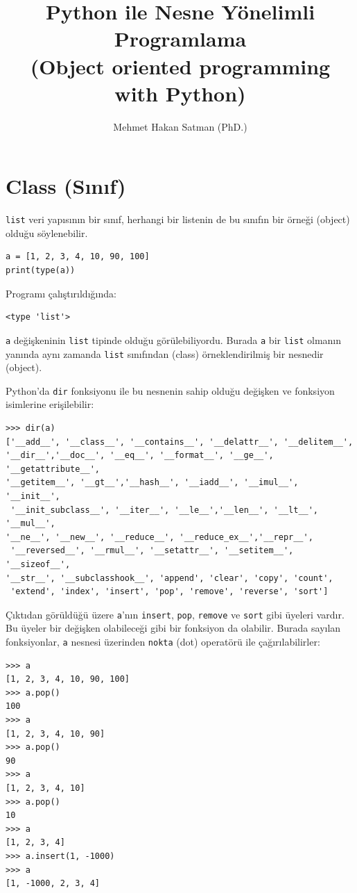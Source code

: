 \documentclass[12pt]{report}
\author{Mehmet Hakan Satman (PhD.)}
\title{Python ile Nesne Yönelimli Programlama \\ (Object oriented programming with Python)}
\begin{document}
	\maketitle
	\tableofcontents
	
\pagebreak
\section{Class (Sınıf)}
\texttt{list} veri yapısının bir sınıf, herhangi bir listenin de bu sınıfın bir örneği (object) olduğu söylenebilir. 

\begin{Verbatim}[frame = single]
a = [1, 2, 3, 4, 10, 90, 100]
print(type(a))
\end{Verbatim}

Programı çalıştırıldığında: 

\begin{Verbatim}[frame = single]
<type 'list'>
\end{Verbatim}

\texttt{a} değişkeninin \texttt{list} tipinde olduğu görülebiliyordu. Burada \texttt{a} bir \texttt{list} olmanın yanında aynı zamanda \texttt{list} sınıfından (class) örneklendirilmiş bir nesnedir (object).

Python'da \texttt{dir} fonksiyonu ile bu nesnenin sahip olduğu değişken ve fonksiyon isimlerine erişilebilir:

\begin{Verbatim}[frame = single]
>>> dir(a)
['__add__', '__class__', '__contains__', '__delattr__', '__delitem__', 
'__dir__','__doc__', '__eq__', '__format__', '__ge__', '__getattribute__', 
'__getitem__', '__gt__','__hash__', '__iadd__', '__imul__', '__init__',
 '__init_subclass__', '__iter__', '__le__','__len__', '__lt__', '__mul__', 
'__ne__', '__new__', '__reduce__', '__reduce_ex__','__repr__',
 '__reversed__', '__rmul__', '__setattr__', '__setitem__', '__sizeof__',
'__str__', '__subclasshook__', 'append', 'clear', 'copy', 'count',
 'extend', 'index', 'insert', 'pop', 'remove', 'reverse', 'sort']
\end{Verbatim}

Çıktıdan görüldüğü üzere \texttt{a}'nın \texttt{insert}, \texttt{pop}, \texttt{remove} ve \texttt{sort} gibi üyeleri vardır. Bu üyeler bir değişken olabileceği gibi bir fonksiyon da olabilir. Burada sayılan fonksiyonlar, \texttt{a} nesnesi üzerinden \texttt{nokta} (dot) operatörü ile çağırılabilirler:

\begin{Verbatim}[frame = single]
>>> a
[1, 2, 3, 4, 10, 90, 100]
>>> a.pop()
100
>>> a
[1, 2, 3, 4, 10, 90]
>>> a.pop()
90
>>> a
[1, 2, 3, 4, 10]
>>> a.pop()
10
>>> a
[1, 2, 3, 4]
>>> a.insert(1, -1000)
>>> a
[1, -1000, 2, 3, 4]
\end{Verbatim}
\end{document}

